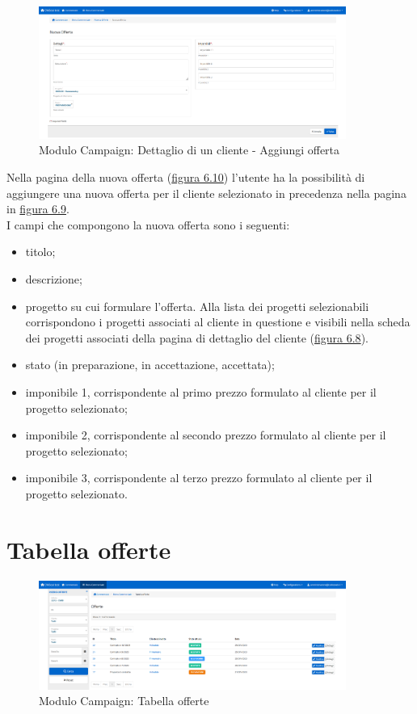 \begin{figure}[!h]
\centering
\includegraphics[width=380px]{../images/UI/10-nuovaOfferta.png}
\caption{Modulo Campaign: Dettaglio di un cliente - Aggiungi offerta}
\label{fig:nuovaOfferta}
\end{figure}

\noindent Nella pagina della nuova offerta ({\hyperref[fig:nuovaOfferta]{figura 6.10}}) l'utente ha la possibilità di aggiungere una nuova offerta per il cliente selezionato in precedenza nella pagina in {\hyperref[fig:dettaglioCliente2]{figura 6.9}}. \\
I campi che compongono la nuova offerta sono i seguenti:
\begin{itemize}
\item titolo;
\item descrizione;
\item progetto su cui formulare l'offerta. Alla lista dei progetti selezionabili corrispondono i progetti associati al cliente in questione e visibili nella scheda dei progetti associati della pagina di dettaglio del cliente ({\hyperref[fig:dettaglioCliente1]{figura 6.8}}). 
\item stato (in preparazione, in accettazione, accettata);
\item imponibile 1, corrispondente al primo prezzo formulato al cliente per il progetto selezionato;
\item imponibile 2, corrispondente al secondo prezzo formulato al cliente per il progetto selezionato;
\item imponibile 3, corrispondente al terzo prezzo formulato al cliente per il progetto selezionato.
\end{itemize}

\pagebreak

\section{Tabella offerte}
\begin{figure}[!h]
\centering
\includegraphics[width=380px]{../images/UI/11-tabellaOfferte.png}
\caption{Modulo Campaign: Tabella offerte}
\label{fig:tabellaOfferte}
\end{figure}

